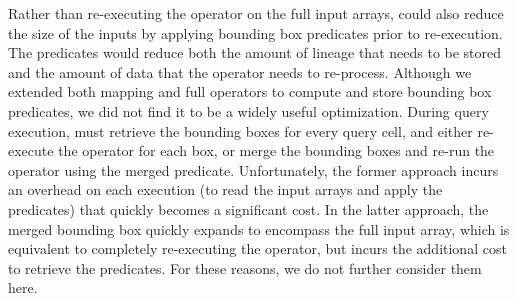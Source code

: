 Rather than re-executing the operator on the full input arrays, \sys{} could
also reduce the size of the inputs by applying bounding box predicates prior to
re-execution.  The predicates would reduce both the amount of lineage that
needs to be stored and the amount of data that the operator needs to
re-process.  Although we extended both mapping and full operators to compute
and store bounding box predicates, we did not find it to be a widely useful
optimization.  During query execution, \sys{} must retrieve the bounding boxes
for every query cell, and either re-execute the operator for each box, or merge
the bounding boxes and re-run the operator using the merged predicate.
Unfortunately, the former approach incurs an overhead on each execution (to
read the input arrays and apply the predicates) that quickly becomes a significant
cost.  In the latter approach, the merged bounding box quickly expands to
encompass the full input array, which is equivalent to completely re-executing
the operator, but incurs the additional cost to retrieve the predicates.  For
these reasons, we do not further consider them here.



